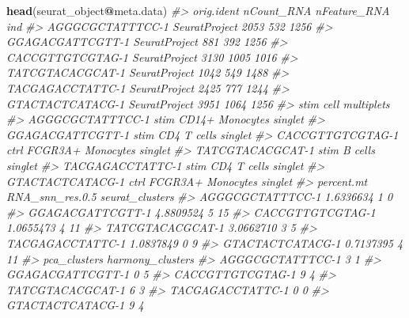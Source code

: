 \documentclass[
]{book}
\newenvironment{Shaded}{\begin{snugshade}}{\end{snugshade}}
\newcommand{\CommentTok}[1]{\textcolor[rgb]{0.56,0.35,0.01}{\textit{#1}}}
\newcommand{\FunctionTok}[1]{\textcolor[rgb]{0.13,0.29,0.53}{\textbf{#1}}}
\newcommand{\NormalTok}[1]{#1}
\newcommand{\SpecialCharTok}[1]{\textcolor[rgb]{0.81,0.36,0.00}{\textbf{#1}}}
\begin{document}
\begin{Shaded}
\begin{Highlighting}[]
\FunctionTok{head}\NormalTok{(seurat\_object}\SpecialCharTok{@}\NormalTok{meta.data)}
\CommentTok{\#\textgreater{}                     orig.ident nCount\_RNA nFeature\_RNA  ind}
\CommentTok{\#\textgreater{} AGGGCGCTATTTCC{-}1 SeuratProject       2053          532 1256}
\CommentTok{\#\textgreater{} GGAGACGATTCGTT{-}1 SeuratProject        881          392 1256}
\CommentTok{\#\textgreater{} CACCGTTGTCGTAG{-}1 SeuratProject       3130         1005 1016}
\CommentTok{\#\textgreater{} TATCGTACACGCAT{-}1 SeuratProject       1042          549 1488}
\CommentTok{\#\textgreater{} TACGAGACCTATTC{-}1 SeuratProject       2425          777 1244}
\CommentTok{\#\textgreater{} GTACTACTCATACG{-}1 SeuratProject       3951         1064 1256}
\CommentTok{\#\textgreater{}                  stim              cell multiplets}
\CommentTok{\#\textgreater{} AGGGCGCTATTTCC{-}1 stim   CD14+ Monocytes    singlet}
\CommentTok{\#\textgreater{} GGAGACGATTCGTT{-}1 stim       CD4 T cells    singlet}
\CommentTok{\#\textgreater{} CACCGTTGTCGTAG{-}1 ctrl FCGR3A+ Monocytes    singlet}
\CommentTok{\#\textgreater{} TATCGTACACGCAT{-}1 stim           B cells    singlet}
\CommentTok{\#\textgreater{} TACGAGACCTATTC{-}1 stim       CD4 T cells    singlet}
\CommentTok{\#\textgreater{} GTACTACTCATACG{-}1 ctrl FCGR3A+ Monocytes    singlet}
\CommentTok{\#\textgreater{}                  percent.mt RNA\_snn\_res.0.5 seurat\_clusters}
\CommentTok{\#\textgreater{} AGGGCGCTATTTCC{-}1  1.6336634               1               0}
\CommentTok{\#\textgreater{} GGAGACGATTCGTT{-}1  4.8809524               5              15}
\CommentTok{\#\textgreater{} CACCGTTGTCGTAG{-}1  1.0655473               4              11}
\CommentTok{\#\textgreater{} TATCGTACACGCAT{-}1  3.0662710               3               5}
\CommentTok{\#\textgreater{} TACGAGACCTATTC{-}1  1.0837849               0               9}
\CommentTok{\#\textgreater{} GTACTACTCATACG{-}1  0.7137395               4              11}
\CommentTok{\#\textgreater{}                  pca\_clusters harmony\_clusters}
\CommentTok{\#\textgreater{} AGGGCGCTATTTCC{-}1            3                1}
\CommentTok{\#\textgreater{} GGAGACGATTCGTT{-}1            0                5}
\CommentTok{\#\textgreater{} CACCGTTGTCGTAG{-}1            9                4}
\CommentTok{\#\textgreater{} TATCGTACACGCAT{-}1            6                3}
\CommentTok{\#\textgreater{} TACGAGACCTATTC{-}1            0                0}
\CommentTok{\#\textgreater{} GTACTACTCATACG{-}1            9                4}

\end{Highlighting}
\end{Shaded}
\end{document}
